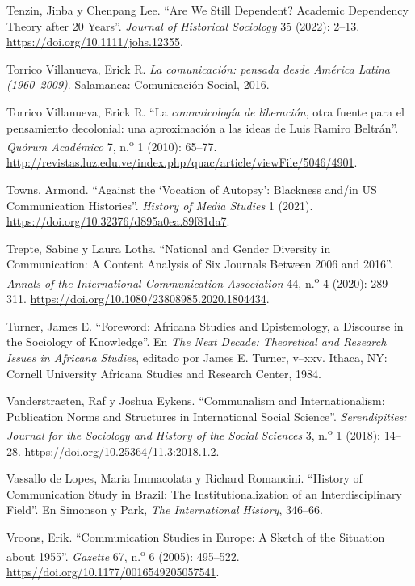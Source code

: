 \documentclass{tufte-handout}
\begin{document}
\begin{hangparas}{.25in}{1}
Tenzin, Jinba y Chenpang Lee. ``Are We Still Dependent? Academic
Dependency Theory after 20 Years''. \emph{Journal of Historical
Sociology} 35 (2022): 2--13. \url{https://doi.org/10.1111/johs.12355}.

Torrico Villanueva, Erick R. \emph{La comunicación: pensada desde
América Latina (1960--2009)}. Salamanca: Comunicación Social, 2016.

Torrico Villanueva, Erick R. ``La \emph{comunicología de liberación},
otra fuente para el pensamiento decolonial: una aproximación a las ideas
de Luis Ramiro Beltrán''. \emph{Quórum Académico} 7,
n.\textsuperscript{o} 1 (2010): 65--77.
\url{http://revistas.luz.edu.ve/index.php/quac/article/viewFile/5046/4901}.

Towns, Armond. ``Against the `Vocation of Autopsy': Blackness and/in US
Communication Histories''. \emph{History of Media Studies} 1 (2021).
\url{https://doi.org/10.32376/d895a0ea.89f81da7}.

Trepte, Sabine y Laura Loths. ``National and Gender Diversity in
Communication: A Content Analysis of Six Journals Between 2006 and
2016''. \emph{Annals of the International Communication Association} 44,
n.\textsuperscript{o} 4 (2020): 289--311.
\url{https://doi.org/10.1080/23808985.2020.1804434}.

Turner, James E. ``Foreword: Africana Studies and Epistemology, a
Discourse in the Sociology of Knowledge''. En \emph{The Next Decade:
Theoretical and Research Issues in Africana Studies}, editado por James
E. Turner, v--xxv. Ithaca, NY: Cornell University Africana Studies and
Research Center, 1984.

Vanderstraeten, Raf y Joshua Eykens. ``Communalism and Internationalism:
Publication Norms and Structures in International Social Science''.
\emph{Serendipities: Journal for the Sociology and History of the Social
Sciences} 3, n.\textsuperscript{o} 1 (2018): 14--28.
\url{https://doi.org/10.25364/11.3:2018.1.2}.

Vassallo de Lopes, Maria Immacolata y Richard Romancini. ``History of
Communication Study in Brazil: The Institutionalization of an
Interdisciplinary Field''. En Simonson y Park, \emph{The International
History}, 346--66.

Vroons, Erik. ``Communication Studies in Europe: A Sketch of the
Situation about 1955''. \emph{Gazette} 67, n.\textsuperscript{o} 6
(2005): 495--522.
\href{file:///C:/Users/simonsop/Downloads/https/doi.org/10.1177/0016549205057541}{https//doi.org/10.1177/0016549205057541}.


\end{hangparas}
\end{document}
